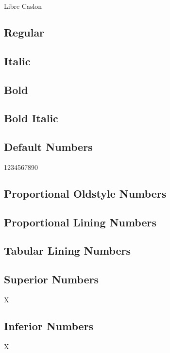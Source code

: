 \documentclass{article}
\begin{document}
\begin{center}\huge
Libre Caslon
\end{center}

\subsection*{Regular}
\lipsum[1]

\subsection*{Italic}
\textit{\lipsum[2]} 

\subsection*{Bold}
\textbf{\lipsum[3]}


\subsection*{Bold Italic}
\textbf{\textit{\lipsum[4]}}

\subsection*{Default Numbers}

1234567890

\subsection*{Proportional Oldstyle Numbers}

{}

\subsection*{Proportional Lining Numbers}

{}

\subsection*{Tabular Lining Numbers}

{}

\subsection*{Superior Numbers}

X

\subsection*{Inferior Numbers}

X
\end{document}
